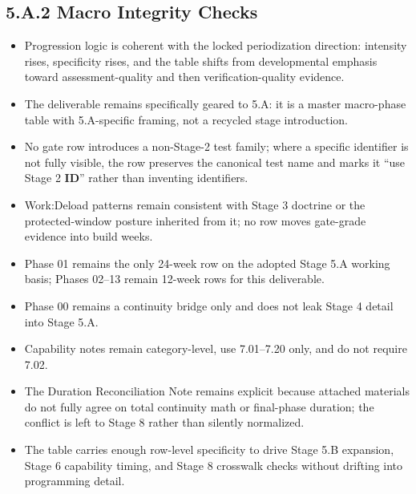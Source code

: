 \documentclass[10pt]{article}
\begin{document}
\subsection*{5.A.2 Macro Integrity Checks}
{}

\begin{itemize}
\item Progression logic is coherent with the locked periodization direction: intensity rises, specificity rises, and the table shifts from developmental emphasis toward assessment-quality and then verification-quality evidence.
\item The deliverable remains specifically geared to 5.A: it is a master macro-phase table with 5.A-specific framing, not a recycled stage introduction.
\item No gate row introduces a non-Stage-2 test family; where a specific identifier is not fully visible, the row preserves the canonical test name and marks it “use Stage 2 \textbf{ID}” rather than inventing identifiers.
\item Work:Deload patterns remain consistent with Stage 3 doctrine or the protected-window posture inherited from it; no row moves gate-grade evidence into build weeks.
\item Phase 01 remains the only 24-week row on the adopted Stage 5.A working basis; Phases 02–13 remain 12-week rows for this deliverable.
\item Phase 00 remains a continuity bridge only and does not leak Stage 4 detail into Stage 5.A.
\item Capability notes remain category-level, use 7.01–7.20 only, and do not require 7.02.
\item The Duration Reconciliation Note remains explicit because attached materials do not fully agree on total continuity math or final-phase duration; the conflict is left to Stage 8 rather than silently normalized.
\item The table carries enough row-level specificity to drive Stage 5.B expansion, Stage 6 capability timing, and Stage 8 crosswalk checks without drifting into programming detail.
\end{itemize}
\end{document}
